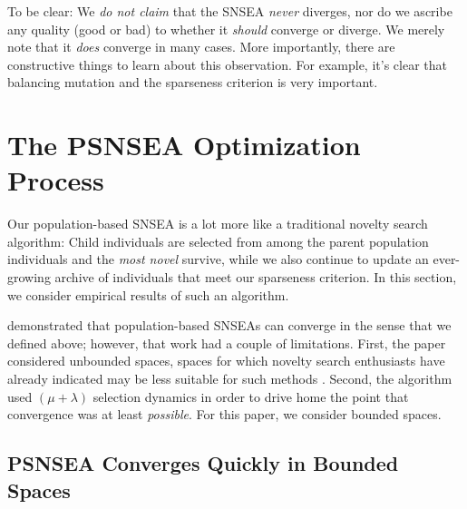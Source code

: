 \documentclass[twoside]{article}
\begin{document}
To be clear:  We \emph{do not claim} that the SNSEA \emph{never} diverges, nor do we ascribe any quality (good or bad) to whether it \emph{should} converge or diverge.  We merely note that it \emph{does} converge in many cases.  More importantly, there are constructive things to learn about this observation.  For example, it's clear that balancing mutation and the sparseness criterion is very important.  %


\section{The PSNSEA Optimization Process}
\label{sec:resultpsnesea}

Our population-based SNSEA is a lot more like a traditional novelty search algorithm:  Child individuals are selected from among the parent population individuals and the \emph{most novel} survive, while we also continue to update an ever-growing archive of individuals that meet our sparseness criterion.  In this section, we consider empirical results of such an algorithm.

\citet{Wiegand2021flairs} demonstrated that population-based SNSEAs can converge in the sense that we defined above; however, that work had a couple of limitations.  First, the paper considered unbounded spaces, spaces for which novelty search enthusiasts have already indicated may be less suitable for such methods \citep{LehmanStanley2008ssls}.  Second, the algorithm used $(\mu+\lambda)$ selection dynamics in order to drive home the point that convergence was at least \emph{possible}.  For this paper, we consider bounded spaces. %


\subsection{PSNSEA Converges Quickly in Bounded Spaces}
\label{subsec:psnsea:bounded}
\end{document}
